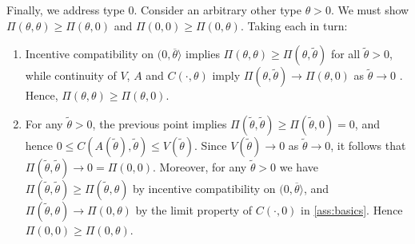 \documentclass[12 pt]{article}
\makeatletter
\newenvironment{proof}[1][Proof]{\noindent\textbf{#1} }{\ \rule{0.5em}{0.5em}}
\theoremstyle{remark}
\theoremstyle{definition}
\def\typemin{0}
\def\typemax{\overline \theta}
\renewenvironment{proof}[1][\proofname] {\par\pushQED{\qed}\normalfont\topsep6\p@\@plus6\p@\relax\trivlist\item[\hskip\labelsep\bfseries#1\@addpunct{.}]\ignorespaces}{\popQED\endtrivlist\@endpefalse}
\makeatother
\begin{document}
\begin{proof}[Proof of \autoref{prop:sufficiency}]
Finally, we address type $0$. Consider an arbitrary other type $\theta>0$. We must show $\Pi(\theta, \theta) \geq \Pi(\theta, 0)$ and $\Pi(0, 0)\geq \Pi(0,\theta)$. Taking each in turn: 
\begin{enumerate}
\item Incentive compatibility on $(\typemin,\typemax\rangle$ implies $\Pi(\theta, \theta) \geq \Pi(\theta, \tilde{\theta})$ for all $\tilde{\theta} > 0$, while continuity of $V$, $A$ and $C(\cdot,\theta)$ imply $\Pi(\theta, \tilde{\theta}) \to \Pi(\theta, 0)$ as $\tilde{\theta} \to 0$ . Hence, $\Pi(\theta, \theta) \geq \Pi(\theta, 0)$.
\item For any $\tilde \theta>0$, the previous point implies  $\Pi(\tilde{\theta}, \tilde{\theta}) \geq \Pi(\tilde{\theta}, 0)=0$, and hence $0\leq C(A(\tilde{\theta}), \tilde{\theta}) \leq V(\tilde{\theta})$. Since  $V(\tilde \theta) \rightarrow 0$ as $\tilde{\theta} \rightarrow 0$, it follows that $\Pi(\tilde{\theta}, \tilde{\theta}) \rightarrow 0=\Pi(0,0)$. Moreover, for any $\tilde{\theta}>0$ we have $\Pi(\tilde{\theta}, \tilde{\theta}) \geq \Pi(\tilde{\theta}, \theta)$ by incentive compatibility on $(\typemin,\typemax\rangle$, and $\Pi(\tilde{\theta}, \theta) \rightarrow \Pi(0, \theta)$ by the limit property of $C(\cdot, 0)$ in \autoref{ass:basics}. Hence $\Pi(0,0) \geq \Pi(0,\theta)$.  \qedhere
\end{enumerate}
\end{proof}
\end{document}
